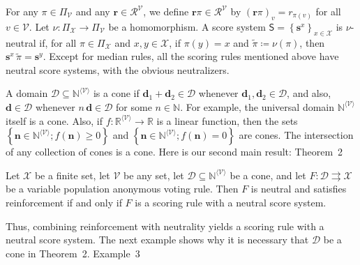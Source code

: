 \documentclass[
]{article}
\begin{document}
For any \(\pi \in \Pi_{\mathcal{V}}\) and any
\(\mathbf{r} \in \mathcal{R}^{\mathcal{V}}\), we define
\(\mathbf{r}\pi \in \mathcal{R}^{\mathcal{V}}\) by
\(\left( \mathbf{r}\pi \right)_{v} = r_{\pi{(v)}}\) for all
\(v \in \mathcal{V}\). Let
\(\left. \nu:\Pi_{\mathcal{X}}\longrightarrow\Pi_{\mathcal{V}} \right.\)
be a homomorphism. A score system
\(\mathsf{S} = \left\{ \mathbf{s}^{x} \right\}_{x \in \mathcal{X}}\) is
\(\nu\)-neutral if, for all \(\pi \in \Pi_{\mathcal{X}}\) and
\(x,y \in \mathcal{X}\), if \(\pi(y) = x\) and
\(\widetilde{\pi} ≔ \nu(\pi)\), then
\(\mathbf{s}^{x}\,\widetilde{\pi} = \mathbf{s}^{y}\). Except for median
rules, all the scoring rules mentioned above have neutral score systems,
with the obvious neutralizers.

A domain
\(\mathcal{D} \subseteq \mathbb{N}^{\langle\mathcal{V}\rangle}\) is a
cone if \(\mathbf{d}_{1} + \mathbf{d}_{2} \in \mathcal{D}\) whenever
\(\mathbf{d}_{1},\mathbf{d}_{2} \in \mathcal{D}\), and also,
\(\mathbf{d} \in \mathcal{D}\) whenever
\(n\,\mathbf{d} \in \mathcal{D}\) for some \(n \in \mathbb{N}\). For
example, the universal domain \(\mathbb{N}^{\langle\mathcal{V}\rangle}\)
itself is a cone. Also, if
\(\left. f:\mathbb{R}^{\langle\mathcal{V}\rangle}\longrightarrow\mathbb{R} \right.\)
is a linear function, then the sets
\(\left\{ \mathbf{n} \in \mathbb{N}^{\langle\mathcal{V}\rangle};f\left( \mathbf{n} \right) \geq 0 \right\}\)
and
\(\left\{ \mathbf{n} \in \mathbb{N}^{\langle\mathcal{V}\rangle};f\left( \mathbf{n} \right) = 0 \right\}\)
are cones. The intersection of any collection of cones is a cone. Here
is our second main result: Theorem~2

Let \(\mathcal{X}\) be a finite set, let \(\mathcal{V}\) be any set, let
\(\mathcal{D} \subseteq \mathbb{N}^{\langle\mathcal{V}\rangle}\) be a
cone, and let
\(\left. F:\mathcal{D}\rightrightarrows\mathcal{X} \right.\) be a
variable population anonymous voting rule. Then \(F\) is neutral and
satisfies reinforcement if and only if \(F\) is a scoring rule with a
neutral score system.

Thus, combining reinforcement with neutrality yields a scoring rule with
a neutral score system. The next example shows why it is necessary that
\(\mathcal{D}\) be a cone in Theorem~2. Example~3
\end{document}
